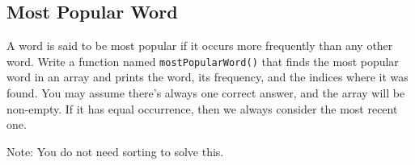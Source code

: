 \subsection{Most Popular Word}

A word is said to be most popular if it occurs more frequently than any other word. Write a function named \texttt{mostPopularWord()} that finds the most popular word in an array and prints the word, its frequency, and the indices where it was found. You may assume there's always one correct answer, and the array will be non-empty. If it has equal occurrence, then we always consider the most recent one.

Note: You do not need sorting to solve this.



